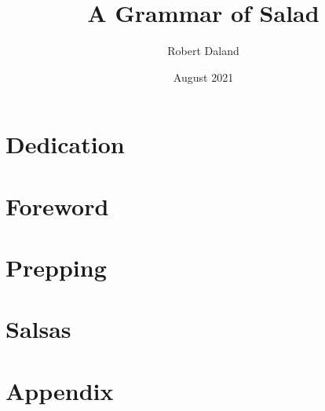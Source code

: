 \documentclass[12pt]{book}
\title{ {A Grammar of Salad} }
\author{Robert Daland}
\date{August 2021}
\begin{document}
\maketitle
\chapter*{Dedication} 
\chapter*{Foreword} 
\tableofcontents
\chapter{Prepping} 
\chapter{Salsas} 
\chapter{Appendix} 
\end{document}

